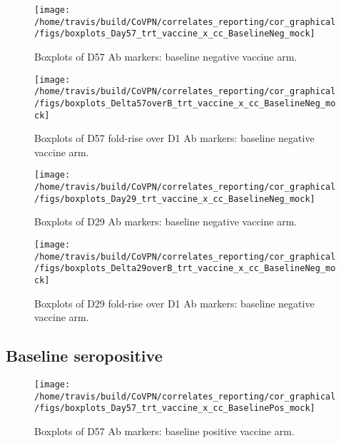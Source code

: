 \documentclass[]{book}
\theoremstyle{definition}
\theoremstyle{definition}
\theoremstyle{definition}
\newcommand{\1}{\mathbbm{1}}
\begin{document}
\begin{figure}[H]

{\centering \texttt{[image: /home/travis/build/CoVPN/correlates\_reporting/cor\_graphical/figs/boxplots\_Day57\_trt\_vaccine\_x\_cc\_BaselineNeg\_mock]} 

}

\caption{Boxplots of D57 Ab markers: baseline negative vaccine arm.}\label{fig:unnamed-chunk-5}
\end{figure}

\clearpage
\begin{figure}[H]

{\centering \texttt{[image: /home/travis/build/CoVPN/correlates\_reporting/cor\_graphical/figs/boxplots\_Delta57overB\_trt\_vaccine\_x\_cc\_BaselineNeg\_mock]} 

}

\caption{Boxplots of D57 fold-rise over D1 Ab markers: baseline negative vaccine arm.}\label{fig:unnamed-chunk-6}
\end{figure}

\clearpage
\begin{figure}[H]

{\centering \texttt{[image: /home/travis/build/CoVPN/correlates\_reporting/cor\_graphical/figs/boxplots\_Day29\_trt\_vaccine\_x\_cc\_BaselineNeg\_mock]} 

}

\caption{Boxplots of D29 Ab markers: baseline negative vaccine arm.}\label{fig:unnamed-chunk-7}
\end{figure}

\clearpage
\begin{figure}[H]

{\centering \texttt{[image: /home/travis/build/CoVPN/correlates\_reporting/cor\_graphical/figs/boxplots\_Delta29overB\_trt\_vaccine\_x\_cc\_BaselineNeg\_mock]} 

}

\caption{Boxplots of D29 fold-rise over D1 Ab markers: baseline negative vaccine arm.}\label{fig:unnamed-chunk-8}
\end{figure}

\clearpage

\hypertarget{baseline-seropositive}{%
\subsection{Baseline seropositive}\label{baseline-seropositive}}

\begin{figure}[H]

{\centering \texttt{[image: /home/travis/build/CoVPN/correlates\_reporting/cor\_graphical/figs/boxplots\_Day57\_trt\_vaccine\_x\_cc\_BaselinePos\_mock]} 

}

\caption{Boxplots of D57 Ab markers: baseline positive vaccine arm.}\label{fig:unnamed-chunk-9}
\end{figure}
\end{document}
